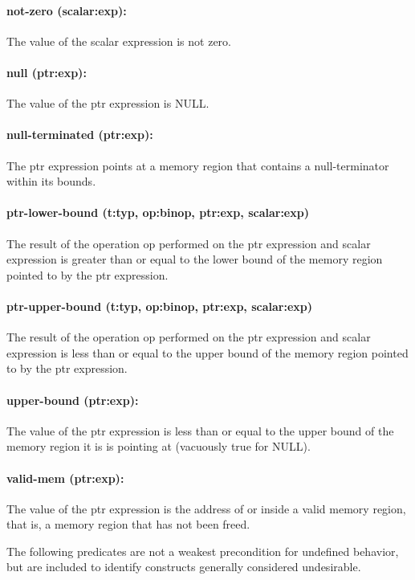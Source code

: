 \documentclass[11pt]{article}
\begin{document}
\paragraph{not-zero (scalar:exp): }
The value of the scalar expression is not zero.

\paragraph{null (ptr:exp): }
The value of the ptr expression is NULL.

\paragraph{null-terminated (ptr:exp): }
The ptr expression points at a memory region that contains a null-terminator
within its bounds.

\paragraph{ptr-lower-bound (t:typ, op:binop, ptr:exp, scalar:exp)}
The result of the operation op performed on the ptr expression and scalar expression
is greater than or equal to the lower bound of the memory region pointed to by
the ptr expression.

\paragraph{ptr-upper-bound (t:typ, op:binop, ptr:exp, scalar:exp)}
The result of the operation op performed on the ptr expression and scalar expression
is less than or equal to the upper bound of the memory region pointed to by the ptr
expression.

\paragraph{upper-bound (ptr:exp):}
The value of the ptr expression is less than or equal to the
    upper bound of the memory region it is is pointing at (vacuously true for NULL).

\paragraph{valid-mem (ptr:exp): }
The value of the ptr expression is the address of or inside a 
	valid memory region, that is, a memory region that has not been freed.

The following predicates are not a weakest precondition for undefined behavior, but
are included to identify constructs generally considered undesirable.
\end{document}
